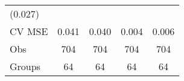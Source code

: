 \documentclass[12pt,twoside]{reedthesis}
\begin{document}
\begin{longtable}[]{@{}lcccc@{}}
\begin{minipage}[t]{0.11\columnwidth}
  (0.027)\strut
  \end{minipage}\tabularnewline
  \begin{minipage}[t]{0.26\columnwidth}\raggedright\strut
  CV MSE\strut
  \end{minipage} & \begin{minipage}[t]{0.12\columnwidth}\centering\strut
  0.041\strut
  \end{minipage} & \begin{minipage}[t]{0.14\columnwidth}\centering\strut
  0.040\strut
  \end{minipage} & \begin{minipage}[t]{0.14\columnwidth}\centering\strut
  0.004\strut
  \end{minipage} & \begin{minipage}[t]{0.11\columnwidth}\centering\strut
  0.006\strut
  \end{minipage}\tabularnewline
  \begin{minipage}[t]{0.26\columnwidth}\raggedright\strut
  Obs\strut
  \end{minipage} & \begin{minipage}[t]{0.12\columnwidth}\centering\strut
  704\strut
  \end{minipage} & \begin{minipage}[t]{0.14\columnwidth}\centering\strut
  704\strut
  \end{minipage} & \begin{minipage}[t]{0.14\columnwidth}\centering\strut
  704\strut
  \end{minipage} & \begin{minipage}[t]{0.11\columnwidth}\centering\strut
  704\strut
  \end{minipage}\tabularnewline
  \begin{minipage}[t]{0.26\columnwidth}\raggedright\strut
  Groups\strut
  \end{minipage} & \begin{minipage}[t]{0.12\columnwidth}\centering\strut
  64\strut
  \end{minipage} & \begin{minipage}[t]{0.14\columnwidth}\centering\strut
  64\strut
  \end{minipage} & \begin{minipage}[t]{0.14\columnwidth}\centering\strut
  64\strut
  \end{minipage} & \begin{minipage}[t]{0.11\columnwidth}\centering\strut
  64\strut
  \end{minipage}\tabularnewline
  \bottomrule
  \end{longtable}
  
\end{document}

